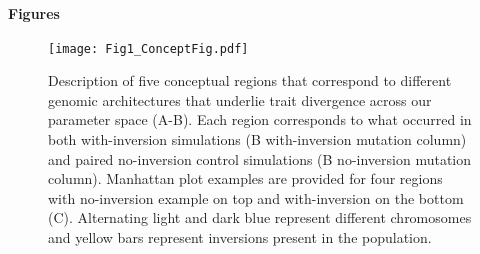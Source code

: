 \documentclass[10pt, scrartlc]{article}
\begin{document}
\pagecolor{white}

\begin{center}
{ \Large \bf Figures }
\end{center}

\listoffigures

\clearpage
\newpage

\begin{figure}[h]
	\begin{center}
		\texttt{[image: Fig1\_ConceptFig.pdf]}
	\end{center}
	\caption[Genomic Basis of Local Adaptation Regions]{Description of five conceptual regions that correspond to different genomic architectures that underlie trait divergence across our parameter space (A-B). Each region corresponds to what occurred in both with-inversion simulations (B with-inversion mutation column) and paired no-inversion control simulations (B no-inversion mutation column). Manhattan plot examples are provided for four regions with no-inversion example on top and with-inversion on the bottom (C). Alternating light and dark blue represent different chromosomes and yellow bars represent inversions present in the population. }
\end{figure}

\clearpage
\newpage
\end{document}
